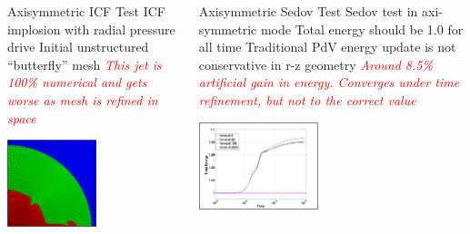 \documentclass[notes=hide,8pt,xcolor=svgnames]{beamer}
\begin{document}
\begin{frame}
\begin{columns}[T]
\begin{column}{0.6\textwidth}
\begin{columns}[T]
\begin{column}{0.4\textwidth}
\begin{block}{\small Axisymmetric ICF Test}
\footnotesize{
ICF implosion with radial pressure drive
\vskip5pt
Initial unstructured “butterfly” mesh
\vskip5pt
\textcolor{red}{\emph{This jet is 100\% numerical and gets worse as mesh is
refined in space}}
}
\begin{center}
\includegraphics[height=1.0in]{figures/AxiICFOld.png}
\end{center}
\end{block}
\end{column}
\begin{column}{0.5\textwidth}
\begin{block}{\small Axisymmetric Sedov Test}
\footnotesize{
Sedov test in axi-symmetric mode
\vskip4pt
Total energy should be 1.0 for all time
\vskip4pt
Traditional PdV energy update is not conservative in r-z geometry
\vskip4pt
\textcolor{red}{\emph{Around 8.5\% artificial gain in energy. Converges under
time refinement, but not to the correct value}}
}
\begin{center}
\includegraphics[height=1.0in]{figures/AxiEnergyConsOld2.png}
\end{center}
\end{block}
\end{column}
\end{columns}
\end{column}
\end{columns}
\end{frame}
\end{document}
